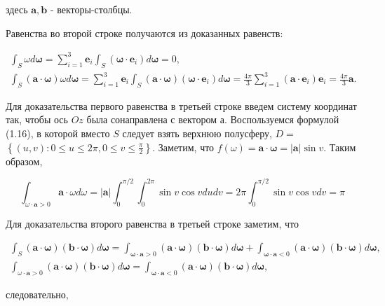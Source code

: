 \documentclass[10pt]{article}
\begin{document}
здесь $\mathbf{a}, \mathbf{b}$ - векторы-столбцы.

Равенства во второй строке получаются из доказанных равенств:

$$
\begin{gathered}
\int_{S} \omega d \boldsymbol{\omega}=\sum_{i=1}^{3} \mathbf{e}_{i} \int_{S}\left(\boldsymbol{\omega} \cdot \mathbf{e}_{i}\right) d \boldsymbol{\omega}=0, \\
\int_{S}(\mathbf{a} \cdot \boldsymbol{\omega}) \omega d \boldsymbol{\omega}=\sum_{i=1}^{3} \mathbf{e}_{i} \int_{S}(\mathbf{a} \cdot \boldsymbol{\omega})\left(\boldsymbol{\omega} \cdot \mathbf{e}_{i}\right) d \boldsymbol{\omega}=\frac{4 \pi}{3} \sum_{i=1}^{3}\left(\mathbf{a} \cdot \mathbf{e}_{i}\right) \mathbf{e}_{i}=\frac{4 \pi}{3} \mathbf{a} .
\end{gathered}
$$

Для доказательства первого равенства в третьей строке введем систему координат так, чтобы ось $O z$ была сонаправлена с вектором а. Воспользуемся формулой (1.16), в которой вместо $S$ следует взять верхнюю полусферу, $D=$ $\left\{(u, v): 0 \leqslant u \leqslant 2 \pi, 0 \leqslant v \leqslant \frac{\pi}{2}\right\}$. Заметим, что $f(\omega)=\mathbf{a} \cdot \boldsymbol{\omega}=|\mathbf{a}| \sin v$. Таким образом,

$$
\int_{\omega \cdot \mathbf{a}>0} \mathbf{a} \cdot \omega d \omega=|\mathbf{a}| \int_{0}^{\pi / 2} \int_{0}^{2 \pi} \sin v \cos v d u d v=2 \pi \int_{0}^{\pi / 2} \sin v \cos v d v=\pi
$$

Для доказательства второго равенства в третьей строке заметим, что

$$
\begin{gathered}
\int_{S}(\mathbf{a} \cdot \boldsymbol{\omega})(\mathbf{b} \cdot \boldsymbol{\omega}) d \boldsymbol{\omega}=\int_{\boldsymbol{\omega} \cdot \mathbf{a}>0}(\mathbf{a} \cdot \boldsymbol{\omega})(\mathbf{b} \cdot \mathbf{\omega}) d \boldsymbol{\omega}+\int_{\boldsymbol{\omega} \cdot \mathbf{a}<0}(\mathbf{a} \cdot \boldsymbol{\omega})(\mathbf{b} \cdot \boldsymbol{\omega}) d \boldsymbol{\omega}, \\
\int_{\omega \cdot \mathbf{a}>0}(\mathbf{a} \cdot \boldsymbol{\omega})(\mathbf{b} \cdot \boldsymbol{\omega}) d \boldsymbol{\omega}=\int_{\boldsymbol{\omega} \cdot \mathbf{a}<0}(\mathbf{a} \cdot \boldsymbol{\omega})(\mathbf{b} \cdot \boldsymbol{\omega}) d \boldsymbol{\omega},
\end{gathered}
$$

следовательно,
\end{document}
